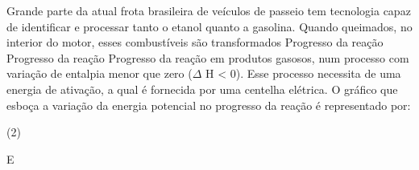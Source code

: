 \documentclass[9qpt]{scrartcl}
\begin{document}
\begin{exercise}[points=1.0]
Grande parte da atual frota brasileira de veículos de passeio tem tecnologia capaz de identificar e processar tanto o etanol quanto a gasolina. Quando queimados, no interior do motor, esses combustíveis são transformados Progresso da reação Progresso da reação Progresso da reação em produtos gasosos, num processo com variação de entalpia menor que zero (\(\Delta\) H < 0). Esse processo necessita de uma energia de ativação, a qual é fornecida por uma centelha elétrica.
O gráfico que esboça a variação da energia potencial no progresso da reação é representado por: 

\begin{choice}(2)
\choice \begin{endiagram}[x-label-text= reação,	y-label-text=Energia,scale=0.5]
\end{endiagram}

\choice \begin{endiagram}	[x-label-text=Reação,	y-label-text=Energia, scale=0.5]
 \end{endiagram}

\choice  \begin{endiagram}	[x-label-text=Reação,	y-label-text=Energia, scale=0.5]
 \end{endiagram}


\choice \begin{endiagram}	[x-label-text=Reação,	y-label-text=Energia, scale=0.5]
 \end{endiagram}

\choice \begin{endiagram}	[x-label-text=Reação,	y-label-text=Energia, scale=0.5]
 \end{endiagram}

\end{choice}
\end{exercise}
\begin{solution}
E
\end{solution}
\end{document}
